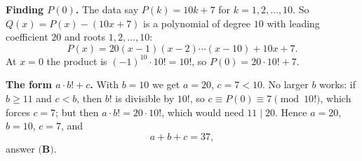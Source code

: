 \textbf{Finding $P(0)$.} The data say $P(k)=10k+7$ for $k=1,2,\dots,10$. So $Q(x)=P(x)-(10x+7)$ is a polynomial of degree $10$ with leading coefficient $20$ and roots $1,2,\dots,10$:
\[
P(x)=20(x-1)(x-2)\cdots(x-10)+10x+7 .
\]
At $x=0$ the product is $(-1)^{10}\cdot10!=10!$, so $P(0)=20\cdot10!+7$.

\textbf{The form $a\cdot b!+c$.} With $b=10$ we get $a=20$, $c=7<10$. No larger $b$ works: if $b\ge11$ and $c<b$, then $b!$ is divisible by $10!$, so $c\equiv P(0)\equiv7\pmod{10!}$, which forces $c=7$; but then $a\cdot b!=20\cdot10!$, which would need $11\mid20$. Hence $a=20$, $b=10$, $c=7$, and
\[
a+b+c=37,
\]
answer $\boxed{\textbf{(B)}}$.
